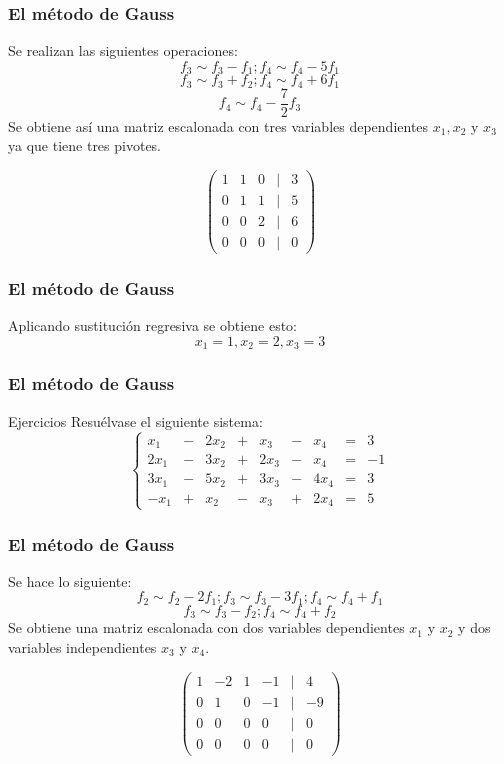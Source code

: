 \documentclass[aspectratio=169]{beamer}
\begin{document}
                 \begin{frame}
    \frametitle{El m\'etodo de Gauss}
Se realizan las siguientes operaciones:
\[f_3 \sim f_3-f_1; f_4 \sim f_4-5f_1\]
\[f_3 \sim f_3+f_2; f_4 \sim f_4+6f_1\]
\[f_4 \sim f_4-\frac{7}{2}f_3\]
Se obtiene as\'i una matriz escalonada con tres variables dependientes $x_1,x_2$ y $x_3$ ya que tiene tres pivotes.

\[
\left(\begin{array}{ccccc}1 & 1 & 0 & | & 3 \\ 0   & 1 & 1 & | & 5 \\
0 &0  & 2& | & 6 \\
0 &0 & 0  & | & 0\end{array}\right)
\]
  \end{frame} 

  
                   \begin{frame}
    \frametitle{El m\'etodo de Gauss}
Aplicando sustituci\'on regresiva se obtiene esto: 
\[x_1 = 1, x_2 = 2, x_3 = 3\]
  \end{frame} 
  
  
  
  
                 \begin{frame}
    \frametitle{El m\'etodo de Gauss}
       \begin{block}{Ejercicios}
Resu\'elvase el siguiente sistema:
\[
\left\{\begin{array}{ccccccccc}x_1 & - & 2x_2 & +  & x_3  & - &x_4& = & 3 \\
2x_1  & -  & 3x_2 & + & 2x_3 & -&x_4 & = & -1 \\
3x_1 &  - &  5x_2 & + & 3x_3 & - &4x_4& = & 3 \\
-x_1 & + & x_2 & - & x_3 & +&2x_4 & = & 5\end{array}\right.
\]

\end{block}
  \end{frame} 
  
  
  \begin{frame}
    \frametitle{El m\'etodo de Gauss}
Se hace lo siguiente:
\[f_2 \sim f_2-2f_1; f_3 \sim f_3-3f_1; f_4 \sim f_4+f_1\]
\[f_3 \sim f_3-f_2; f_4 \sim f_4+f_2\]
Se obtiene una matriz escalonada con dos variables dependientes $x_1$ y $x_2$ y dos variables independientes $x_3$ y $x_4$.

\[
\left(\begin{array}{cccccc}1 &-2 & 1 & -1&| & 4 \\ 0   & 1 & 0& -1 & | & -9 \\
0 &0 &0  & 0& | & 0 \\
0 &0 & 0&0  & | & 0\end{array}\right)
\]
  \end{frame} 
  
\end{document}

